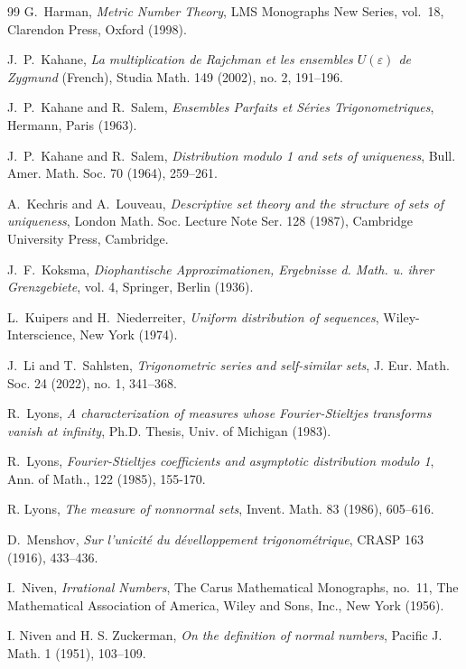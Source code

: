 \documentclass[12pt, twoside]{article}
\theoremstyle{definition}
\numberwithin{equation}{section}
\begin{document}
\begin{thebibliography}{99}
G.~Harman, 
{\em{Metric Number Theory}}, 
LMS Monographs New Series, vol.~18, Clarendon Press, Oxford (1998).

J.~P.~Kahane, 
{\em{La multiplication de Rajchman et les ensembles $U(\varepsilon)$ de Zygmund}} (French),
Studia Math. 149 (2002), no. 2, 191--196. 

J.~P.~Kahane and R.~Salem,
{\em{Ensembles Parfaits et S\'eries Trigonometriques}}, 
Hermann, Paris (1963). 

J.~P.~Kahane and R.~Salem, 
{\em{Distribution modulo 1 and sets of uniqueness}},
Bull. Amer. Math. Soc. 70 (1964), 259--261.

A.~Kechris and A.~Louveau,
{\em{Descriptive set theory and the structure of sets of uniqueness}}, 
London Math. Soc. Lecture Note Ser. 128 (1987), 
Cambridge University Press, Cambridge. 

J.~F.~Koksma, 
{\em{Diophantische Approximationen, Ergebnisse d. Math. u. ihrer
Grenzgebiete}}, vol. 4, Springer, Berlin (1936).

L.~Kuipers and H.~Niederreiter, 
{\em{Uniform distribution of sequences}}, 
Wiley-Interscience, New York (1974).

J.~Li and T.~Sahlsten,
{\em{Trigonometric series and self-similar sets}},
J. Eur. Math. Soc. 24 (2022), no. 1, 341--368.

R.~Lyons, 
{\em{A characterization of measures whose Fourier-Stieltjes transforms vanish at infinity}}, 
Ph.D. Thesis, Univ. of Michigan (1983). 

R.~Lyons,
{\em{Fourier-Stieltjes coefficients and asymptotic distribution modulo 1}}, 
Ann. of Math., 122 (1985), 155-170. 

R. Lyons,
{\em{The measure of nonnormal sets}},
Invent. Math. 83 (1986), 605--616.

D.~Menshov, 
{\em{Sur l’unicit\'e du d\'evelloppement trigonom\'etrique}}, 
CRASP 163 (1916), 433--436.

I.~Niven, 
{\em{Irrational Numbers}}, 
The Carus Mathematical Monographs, no.~11, The Mathematical Association of America, 
Wiley and Sons, Inc., New York (1956). 

I. Niven and H. S. Zuckerman,
{\em{On the definition of normal numbers}},
Pacific J. Math. 1 (1951), 103--109.


\end{thebibliography}
\end{document}
